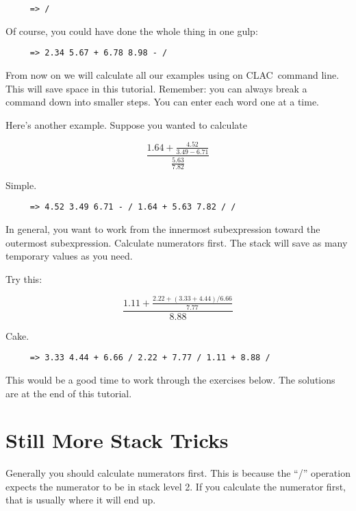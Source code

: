 \documentclass{report}
\newcommand{\CLAC}{CLAC}
\begin{document}
\begin{verbatim}
     => /
\end{verbatim}

Of course, you could have done the whole thing in one gulp:

\begin{verbatim}
     => 2.34 5.67 + 6.78 8.98 - /
\end{verbatim}

From now on we will calculate all our examples using on \CLAC\ command line. This will save space in this tutorial. Remember: you can always break a command down into smaller steps. You can enter each word one at a time.

Here's another example. Suppose you wanted to calculate

\begin{displaymath}
     \frac { 1.64 + \frac {4.52}{3.49 - 6.71} }{ \frac {5.63}{7.82} }
\end{displaymath}

Simple.

\begin{verbatim}
     => 4.52 3.49 6.71 - / 1.64 + 5.63 7.82 / /
\end{verbatim}

In general, you want to work from the innermost subexpression toward the outermost subexpression. Calculate numerators first. The stack will save as many temporary values as you need.

Try this:

\begin{displaymath}
     \frac{1.11 + \frac{2.22 + (3.33 + 4.44)/6.66 }{7.77} }{8.88}
\end{displaymath}

Cake.

\begin{verbatim}
     => 3.33 4.44 + 6.66 / 2.22 + 7.77 / 1.11 + 8.88 /
\end{verbatim}

This would be a good time to work through the exercises below. The solutions are at the end of this tutorial.

\section{Still More Stack Tricks}

Generally you should calculate numerators first. This is because the ``/'' operation expects the numerator to be in stack level 2. If you calculate the numerator first, that is usually where it will end up.
\end{document}
